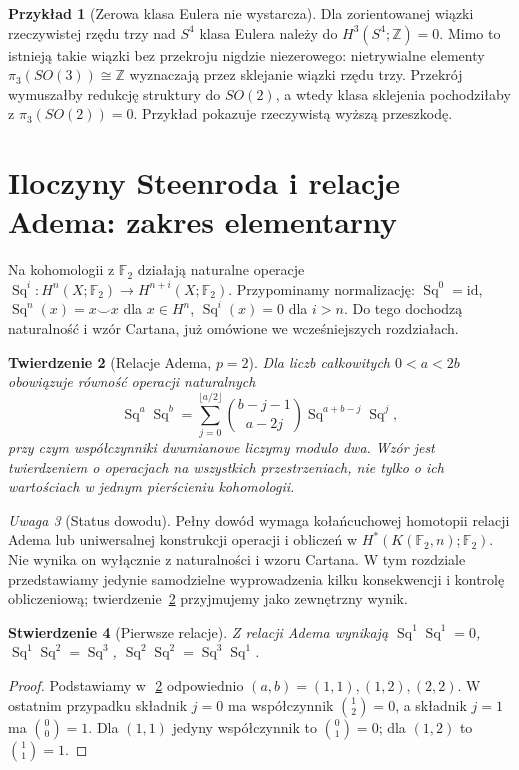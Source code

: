 \documentclass[11pt,a4paper,oneside]{report}
\newcommand{\F}{\mathbb{F}}
\newcommand{\Z}{\mathbb{Z}}
\newcommand{\id}{\mathrm{id}}
\theoremstyle{plain}
\newtheorem{twierdzenie}{Twierdzenie}[section]
\newtheorem{stwierdzenie}[twierdzenie]{Stwierdzenie}
\theoremstyle{definition}
\newtheorem{przyklad}[twierdzenie]{Przykład}
\theoremstyle{remark}
\newtheorem{uwaga}[twierdzenie]{Uwaga}
\begin{document}
\begin{przyklad}[Zerowa klasa Eulera nie wystarcza]
Dla zorientowanej wiązki rzeczywistej rzędu trzy nad
$S^4$ klasa Eulera należy do $H^3(S^4;\Z)=0$.
Mimo to istnieją takie wiązki bez przekroju nigdzie
niezerowego: nietrywialne elementy
$\pi_3(SO(3))\cong\Z$ wyznaczają przez sklejanie
wiązki rzędu trzy. Przekrój wymuszałby redukcję
struktury do $SO(2)$, a wtedy klasa sklejenia pochodziłaby
z $\pi_3(SO(2))=0$.
Przykład pokazuje rzeczywistą wyższą przeszkodę.
\end{przyklad}

\section{Iloczyny Steenroda i relacje Adema: zakres elementarny}
Na kohomologii z $\F_2$ działają naturalne operacje
$\operatorname{Sq}^i:H^n(X;\F_2)\to H^{n+i}(X;\F_2)$.
Przypominamy normalizację:
$\operatorname{Sq}^0=\id$,
$\operatorname{Sq}^n(x)=x\smile x$ dla $x\in H^n$,
$\operatorname{Sq}^i(x)=0$ dla $i>n$.
Do tego dochodzą naturalność i wzór Cartana, już omówione
we wcześniejszych rozdziałach.
\begin{twierdzenie}[Relacje Adema, $p=2$]
\label{thm:xviii-adem}
Dla liczb całkowitych $0<a<2b$ obowiązuje równość
operacji naturalnych
\[
\operatorname{Sq}^a\operatorname{Sq}^b=
\sum_{j=0}^{\lfloor a/2\rfloor}
\binom{b-j-1}{a-2j}
\operatorname{Sq}^{a+b-j}\operatorname{Sq}^{j},
\]
przy czym współczynniki dwumianowe liczymy modulo dwa.
Wzór jest twierdzeniem o operacjach na \emph{wszystkich}
przestrzeniach, nie tylko o ich wartościach w jednym pierścieniu
kohomologii.
\end{twierdzenie}
\begin{uwaga}[Status dowodu]
Pełny dowód wymaga kołańcuchowej homotopii relacji Adema
lub uniwersalnej konstrukcji operacji i obliczeń w
$H^*(K(\F_2,n);\F_2)$. Nie wynika on wyłącznie z
naturalności i wzoru Cartana. W tym rozdziale przedstawiamy
jedynie samodzielne wyprowadzenia kilku konsekwencji i
kontrolę obliczeniową; twierdzenie~\ref{thm:xviii-adem}
przyjmujemy jako zewnętrzny wynik.
\end{uwaga}
\begin{stwierdzenie}[Pierwsze relacje]
Z relacji Adema wynikają
$\operatorname{Sq}^1\operatorname{Sq}^1=0$,
$\operatorname{Sq}^1\operatorname{Sq}^2=\operatorname{Sq}^3$,
$\operatorname{Sq}^2\operatorname{Sq}^2=
\operatorname{Sq}^3\operatorname{Sq}^1$.
\end{stwierdzenie}
\begin{proof}
Podstawiamy w\,~\ref{thm:xviii-adem} odpowiednio
$(a,b)=(1,1),(1,2),(2,2)$. W ostatnim przypadku
składnik $j=0$ ma współczynnik
$\binom{1}{2}=0$, a składnik $j=1$ ma
$\binom{0}{0}=1$. Dla $(1,1)$ jedyny współczynnik to
$\binom{0}{1}=0$; dla $(1,2)$ to $\binom{1}{1}=1$.
\end{proof}
\end{document}
